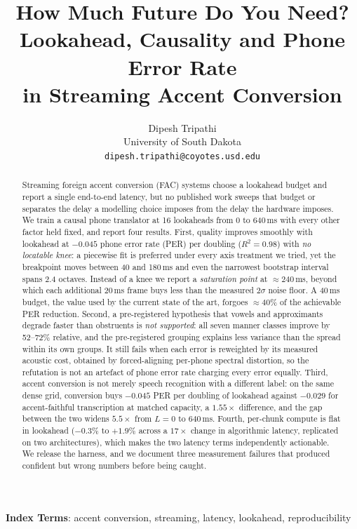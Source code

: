 \documentclass[9pt,a4paper,twocolumn]{article}
\title{\Large How Much Future Do You Need?\\
\large Lookahead, Causality and Phone Error Rate\\
in Streaming Accent Conversion}
\author{Dipesh Tripathi\\
\small University of South Dakota\\
\small \texttt{dipesh.tripathi@coyotes.usd.edu}}
\date{}
\begin{document}
\maketitle

\begin{abstract}
\noindent
Streaming foreign accent conversion (FAC) systems choose a lookahead budget and
report a single end-to-end latency, but no published work sweeps that budget or
separates the delay a modelling choice imposes from the delay the hardware
imposes. We train a causal phone translator at 16 lookaheads from 0 to 640\,ms
with every other factor held fixed, and report four results. First, quality
improves smoothly with lookahead at $-0.045$ phone error rate (PER) per
doubling ($R^2=0.98$) with \emph{no locatable knee}: a piecewise fit is
preferred under every axis treatment we tried, yet the breakpoint moves between
40 and 180\,ms and even the narrowest bootstrap interval spans 2.4 octaves.
Instead of a knee we report a \emph{saturation point} at ${\approx}240$\,ms,
beyond which each additional 20\,ms frame buys less than the measured
$2\sigma$ noise floor. A 40\,ms budget, the value used by the current
state of the art, forgoes ${\approx}40\%$ of the achievable PER reduction.
Second, a pre-registered hypothesis that vowels and approximants degrade faster
than obstruents is \emph{not supported}: all seven manner classes improve by
52--72\% relative, and the pre-registered grouping explains less variance than
the spread within its own groups. It still fails when each error is reweighted
by its measured acoustic cost, obtained by forced-aligning per-phone spectral
distortion, so the refutation is not an artefact of phone error rate charging
every error equally. Third, accent conversion is not merely speech recognition with a different
label: on the same dense grid, conversion buys $-0.045$ PER per doubling of
lookahead against $-0.029$ for accent-faithful transcription at matched
capacity, a $1.55\times$ difference, and the gap between the two widens
$5.5\times$ from $L{=}0$ to $640$\,ms. Fourth, per-chunk compute is flat in
lookahead ($-0.3\%$ to $+1.9\%$ across a $17\times$ change in algorithmic
latency, replicated on two architectures), which makes the two latency terms
independently actionable. We release the harness, and we document three
measurement failures that produced confident but wrong numbers before being
caught.
\end{abstract}

\noindent\textbf{Index Terms}: accent conversion, streaming, latency,
lookahead, reproducibility
\end{document}
